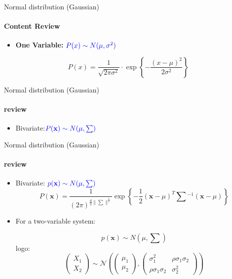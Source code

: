 \documentclass[aspectratio=169]{beamer}
\begin{document}
\begin{frame}{Normal distribution  (Gaussian)}
    \framesubtitle{Content Review}
    \begin{itemize}
        \item \textbf{One Variable:} $\color{blue}{P(x) \sim N(\mu, \sigma^2)}$
    \end{itemize}
    \begin{block}{}
        \begin{equation*}
            P(x) = \dfrac{1}{\sqrt{2\pi\sigma^2}}\cdot 
        \exp\left\{-\frac{(x-\mu)^2}{2\sigma^2}\right\}
        \end{equation*}
    \end{block}
    \centering
    
\end{frame}


\begin{frame}{Normal distribution  (Gaussian)}
    \framesubtitle{review}
    \begin{itemize}
        \item Bivariate:$\color{blue}{P(\mathbf{x}) \sim N(\mu, \textstyle\sum)}$
    \end{itemize}
    \centering
    
\end{frame}

\begin{frame}{Normal distribution  (Gaussian)}
    \framesubtitle{review}
    \begin{itemize}
        \item Bivariate: $\color{blue}{p(\mathbf{x}) \sim N(\mu, \textstyle\sum)}$
    \begin{equation*}
        P(\mathbf{x}) = \frac{1}{(2\pi)^{\frac{d}{2}\|\textstyle\sum\|^{\frac{1}{2}}}}\exp\left\{-\frac{1}{2} (\mathbf{x}-\mu)^T\textstyle\sum{}^{-1}(\mathbf{x}-\mu)\right\}
    \end{equation*}
    
    \item For a two-variable system:
    
    \begin{equation*}
        p(\mathbf{x}) \sim N(\mu, \textstyle\sum)
    \end{equation*}
    logo:     
    \begin{equation*}
        \begin{pmatrix}
            X_1 \\
            X_2
        \end{pmatrix}  \sim \mathcal{N} \left( \begin{pmatrix}
            \mu_1 \\
            \mu_2
        \end{pmatrix} , \begin{pmatrix}
            \sigma^2_1 &  \rho \sigma_1 \sigma_2 \\
            \rho \sigma_1 \sigma_2 &  \sigma^2_2
        \end{pmatrix} \right)
    \end{equation*}
    \end{itemize}
\end{frame}
\end{document}
